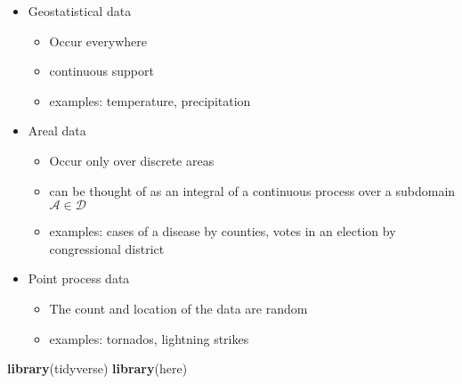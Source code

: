 \documentclass[]{book}
\newenvironment{Shaded}{\begin{snugshade}}{\end{snugshade}}
\newcommand{\KeywordTok}[1]{\textcolor[rgb]{0.13,0.29,0.53}{\textbf{#1}}}
\newcommand{\NormalTok}[1]{#1}
\providecommand{\tightlist}{%
  \setlength{\itemsep}{0pt}\setlength{\parskip}{0pt}}
\begin{document}
\begin{itemize}
\tightlist
\item
  Geostatistical data

  \begin{itemize}
  \tightlist
  \item
    Occur everywhere
  \item
    continuous support
  \item
    examples: temperature, precipitation
  \end{itemize}
\item
  Areal data

  \begin{itemize}
  \tightlist
  \item
    Occur only over discrete areas
  \item
    can be thought of as an integral of a continuous process over a subdomain \(\mathcal{A} \in \mathcal{D}\)
  \item
    examples: cases of a disease by counties, votes in an election by congressional district
  \end{itemize}
\item
  Point process data

  \begin{itemize}
  \tightlist
  \item
    The count and location of the data are random
  \item
    examples: tornados, lightning strikes
  \end{itemize}
\end{itemize}

\begin{Shaded}
\begin{Highlighting}[]
\KeywordTok{library}\NormalTok{(tidyverse)}
\KeywordTok{library}\NormalTok{(here)}
\end{Highlighting}
\end{Shaded}
\end{document}
